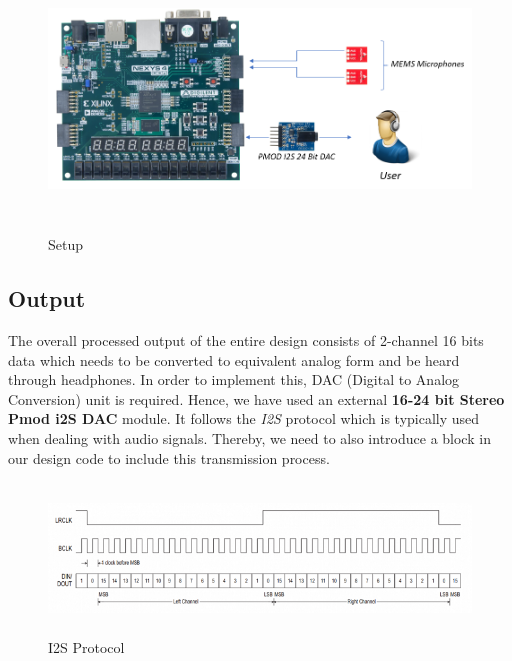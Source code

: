 \documentclass[BTech]{nitkdiss}
\begin{document}
\begin{figure}[h!]
    \centering
    \includegraphics[width = \textwidth, height = 7cm]{fpga_implementation.png}
    \caption{Setup}
    \label{fig:my_label}
\end{figure}
\subsection{Output}
The overall processed output of the entire design consists of 2-channel 16 bits data which needs to be converted to equivalent analog form and be heard through headphones. In order to implement this, DAC (Digital to Analog Conversion) unit is required. Hence, we have used an external \textbf{16-24 bit Stereo Pmod i2S DAC} module. It follows the \textit{I2S} protocol which is typically used when dealing with audio signals. Thereby, we need to also introduce a block in our design code to include this transmission process. 

\begin{figure}[h!]
    \centering
    \includegraphics[width = \textwidth, height = 4cm]{i2s.png}
    \caption{I2S Protocol}
    \label{fig:i2s}
\end{figure}
\end{document}
